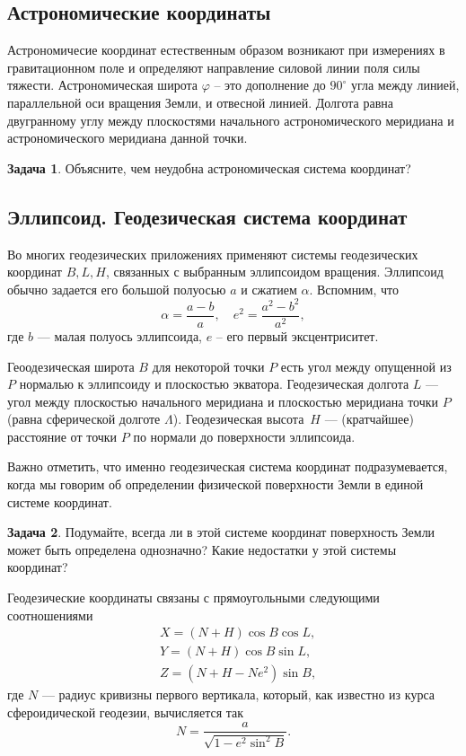 \documentclass[11pt, a4paper]{article}
\theoremstyle{plain}
\theoremstyle{definition}
\newtheorem{problem}{Задача}[section]
\theoremstyle{remark}
\renewcommand{\phi}{\ensuremath{\varphi}}
\begin{document}
\subsection{Астрономические  координаты}
Астрономичесие координат естественным образом возникают при измерениях в гравитационном поле и
определяют направление силовой линии поля силы тяжести.
Астрономическая широта $\phi$ -- это дополнение до $90^\circ$ угла между линией, параллельной оси
вращения Земли, и отвесной линией. Долгота равна двугранному углу между плоскостями начального
астрономического меридиана и астрономического меридиана данной точки.
\begin{problem}
    Объясните, чем неудобна астрономическая система координат?
\end{problem}

\subsection{Эллипсоид. Геодезическая система координат}

Во многих геодезических приложениях применяют системы геодезических координат $B, L, H$, 
связанных с выбранным
эллипсоидом вращения. Эллипсоид обычно задается его большой полуосью $a$ и сжатием $\alpha$.
Вспомним, что 
\begin{equation*}
    \alpha = \frac{a - b}{a},\quad e^2 = \frac{a^2 - b^2}{a^2},
\end{equation*}
где $b$ --- малая полуось эллипсоида, $e$ -- его первый эксцентриситет. 

Геоодезическая широта $B$ для некоторой точки $P$ есть угол между опущенной из $P$ нормалью к эллипсоиду и плоскостью
экватора. Геодезическая долгота $L$ --- угол между плоскостью начального меридиана и плоскостью
меридиана точки $P$ (равна сферической долготе $\Lambda$). Геодезическая высота~$H$ --- (кратчайшее) 
расстояние от точки $P$ по нормали до поверхности эллипсоида.

Важно отметить, что именно геодезическая система координат подразумевается, когда мы говорим
об определении физической поверхности Земли в единой системе координат. 
\begin{problem}
Подумайте, всегда ли в этой
системе координат поверхность Земли может быть определена однозначно? Какие недостатки у этой
системы координат?
\end{problem}

Геодезические координаты связаны с прямоугольными следующими соотношениями
\begin{align*}
    &X = \left( N + H \right)\cos{B}\cos{L},\\
    &Y = \left( N + H \right)\cos{B}\sin{L},\\
    &Z = \left( N + H - Ne^2 \right)\sin{B},
\end{align*}
где $N$ --- радиус кривизны первого вертикала, который, как известно из курса сфероидической
геодезии, вычисляется так
\begin{equation*}
    N = \frac{a}{\sqrt{1 - e^2\sin^2{B}}}.
\end{equation*}
\end{document}
